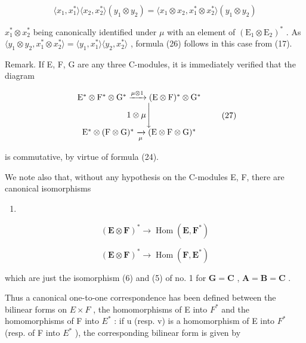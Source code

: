 \[
\langle x _ {1}, x _ {1} ^ {*} \rangle \langle x _ {2}, x _ {2} ^ {*} \rangle (y _ {1} \otimes y _ {2}) = \langle x _ {1} \otimes x _ {2}, x _ {1} ^ {*} \otimes x _ {2} ^ {*} \rangle (y _ {1} \otimes y _ {2})
\]

\(x_{1}^{*}\otimes x_{2}^{*}\) being canonically identified under \(\mu\) with an element of \((\mathrm{E}_{1}\otimes\mathrm{E}_{2})^{*}\) . As \(\langle y_{1}\otimes y_{2},x_{1}^{*}\otimes x_{2}^{*}\rangle=\langle y_{1},x_{1}^{*}\rangle\langle y_{2},x_{2}^{*}\rangle\) , formula (26) follows in this case from (17).

Remark. If E, F, G are any three C-modules, it is immediately verified that the diagram

\[
\begin{array}{c} \mathrm{E} ^ {*} \otimes \mathrm{F} ^ {*} \otimes \mathrm{G} ^ {*} \xrightarrow {\mu \otimes 1} (\mathrm{E} \otimes \mathrm{F}) ^ {*} \otimes \mathrm{G} ^ {*} \\ 1 \otimes \mu \Biggl \downarrow \\ \mathrm{E} ^ {*} \otimes (\mathrm{F} \otimes \mathrm{G}) ^ {*} \xrightarrow [ \mu ]{} (\mathrm{E} \otimes \mathrm{F} \otimes \mathrm{G}) ^ {*} \end{array}\tag{27}
\]

is commutative, by virtue of formula (24).

We note also that, without any hypothesis on the C-modules E, F, there are canonical isomorphisms

\begin{enumerate}
\def\labelenumi{(\arabic{enumi})}
\setcounter{enumi}{27}
\tightlist
\item
\end{enumerate}

\[
(\mathbf {E} \otimes \mathbf {F}) ^ {*} \rightarrow \operatorname{Hom} (\mathbf {E}, \mathbf {F} ^ {*})\tag{29}
\]

\[
(\mathbf {E} \otimes \mathbf {F}) ^ {*} \rightarrow \operatorname{Hom} (\mathbf {F}, \mathbf {E} ^ {*})
\]

which are just the isomorphism (6) and (5) of no. 1 for \(\mathbf{G} = \mathbf{C}\) , \(\mathbf{A} = \mathbf{B} = \mathbf{C}\) .

Thus a canonical one-to-one correspondence has been defined between the bilinear forms on \(E \times F\) , the homomorphisms of E into \(F^{*}\) and the homomorphisms of F into \(E^{*}\) : if u (resp. v) is a homomorphism of E into \(F^{*}\) (resp. of F into \(E^{*}\) ), the corresponding bilinear form is given by

